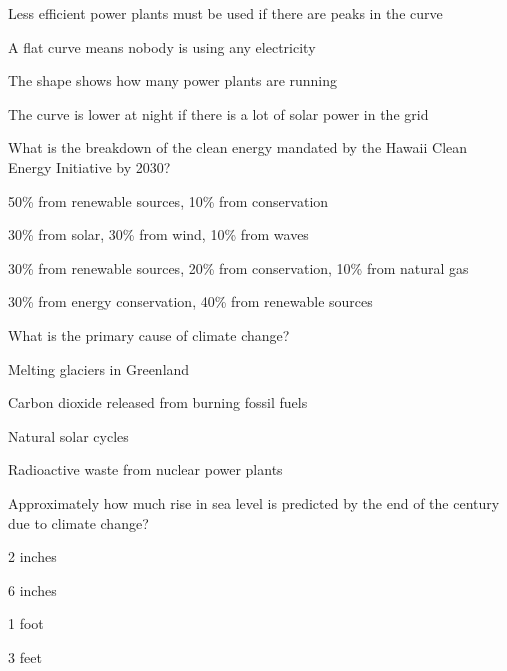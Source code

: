 \documentclass[11pt]{article}
\begin{document}
\begin{answer}
	\item Less efficient power plants must be used if there are peaks in the curve 
	\item A flat curve means nobody is using any electricity
	\item The shape shows how many power plants are running
	\item The curve is lower at night if there is a lot of solar power in the grid
\end{answer}

\begin{question}
	\item What is the breakdown of the clean energy mandated by the Hawaii Clean Energy Initiative by 2030?
\end{question}

\begin{answer}
	\item 50\% from renewable sources, 10\% from conservation
	\item 30\% from solar, 30\% from wind, 10\% from waves
	\item 30\% from renewable sources, 20\% from conservation, 10\% from natural gas
	\item 30\% from energy conservation, 40\% from renewable sources
\end{answer}

\begin{question}
	\item What is the primary cause of climate change?
\end{question}

\begin{answer}
	\item Melting glaciers in Greenland
	\item Carbon dioxide released from burning fossil fuels
	\item Natural solar cycles
	\item Radioactive waste from nuclear power plants
\end{answer}

\begin{question}
	\item Approximately how much rise in sea level is predicted by the end of the century due to climate change?
\end{question}

\begin{answer}
	\item 2 inches
	\item 6 inches
	\item 1 foot
	\item 3 feet
\end{answer}
\end{document}
